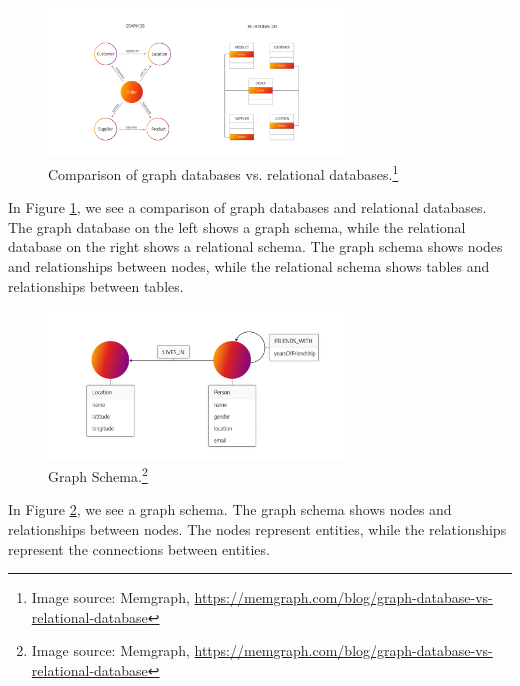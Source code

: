\begin{figure}[h]
    \centering
    \includegraphics[width=0.7\textwidth]{assets/memgraph-graph-database-vs-relational-database.png}
    \caption{Comparison of graph databases vs. relational databases.\protect\footnote{Image source: Memgraph, \url{https://memgraph.com/blog/graph-database-vs-relational-database}}}
    \label{fig:graph_vs_table}
\end{figure}
In Figure \ref{fig:graph_vs_table}, we see a comparison of graph databases and relational databases. The graph database on the left shows a graph schema, while the relational database on the right shows a relational schema. The graph schema shows nodes and relationships between nodes, while the relational schema shows tables and relationships between tables. 

\begin{figure}[h]
    \centering
    \includegraphics[width=0.7\textwidth]{assets/memgraph-graph-schema.png}
    \caption{Graph Schema.\protect\footnote{Image source: Memgraph, \url{https://memgraph.com/blog/graph-database-vs-relational-database}}}
    \label{fig:graph_schema}
\end{figure}
In Figure \ref{fig:graph_schema}, we see a graph schema. The graph schema shows nodes and relationships between nodes. The nodes represent entities, while the relationships represent the connections between entities. 

